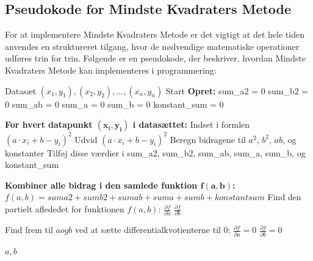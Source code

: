 \subsection{Pseudokode for Mindste Kvadraters Metode}\label{sec:Pseudokode}
For at implementere Mindste Kvadraters Metode er det vigtigt at det hele tiden anvendes en struktureret tilgang, hvor de nødvendige matematiske operationer udføres trin for trin. Følgende er en pseudokode, der beskriver, hvordan Mindste Kvadraters Metode kan implementeres i programmering:
\begin{algorithmic}[1] 
        \REQUIRE Datasæt \((x_1, y_1), (x_2, y_2), \dots, (x_n, y_n)\)
        \STATE Start
        \STATE \textbf{Opret:}
        \STATE \hspace{0.5cm} sum\_a2 = 0 
        \STATE \hspace{0.5cm} sum\_b2 = 0  
        \STATE \hspace{0.5cm} sum\_ab = 0  
        \STATE \hspace{0.5cm} sum\_a = 0   
        \STATE \hspace{0.5cm} sum\_b = 0  
        \STATE \hspace{0.5cm} konstant\_sum = 0
        
        \STATE \textbf{For hvert datapunkt $\mathbf{(x_i, y_i)}$ i datasættet:}
        \STATE Indset i formlen $(a \cdot x_i + b - y_i)^2$
        \STATE \hspace{0.5cm} Udvid \((a \cdot x_i + b - y_i)^2\)
        \STATE \hspace{0.5cm} Beregn bidragene til \(a^2\), \(b^2\), \(ab\), og konstanter
        \STATE \hspace{0.5cm} Tilføj disse værdier i sum\_a2, sum\_b2, sum\_ab, sum\_a, sum\_b, og konstant\_sum
        
        \STATE \textbf{Kombiner alle bidrag i den samlede funktion $\mathbf{f(a,b) }$:}
        \STATE \hspace{0.5cm} $f(a, b) = sum a2 + sum b2 + sum ab + sum a + sum b + konstant sum$        
        \STATE Find den partielt aflededet for funktionen $f(a, b)$:
        \STATE \hspace{0.5cm} $\frac{\partial f}{\partial a}$
        \STATE \hspace{0.5cm} $\frac{\partial f}{\partial b}$
        
        \STATE Find frem til $a og b$ ved at sætte differentialkvotienterne til 0:
        \STATE \hspace{0.5cm} \(\frac{\partial f}{\partial a} = 0\)
        \STATE \hspace{0.5cm} \(\frac{\partial f}{\partial b} = 0\)
        
        \RETURN \(a, b\)
\end{algorithmic}
